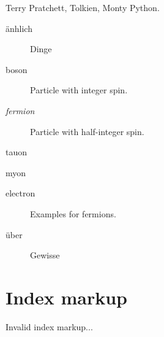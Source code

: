 \documentclass[letterpaper,10pt,english]{sphinxmanual}
\begin{document}
Terry Pratchett, Tolkien, Monty Python.

\begin{description}
\item[{änhlich}] \leavevmode{}\label{markup:term-anhlich}
Dinge

\item[{boson}] \leavevmode{}\label{markup:term-boson}
Particle with integer spin.

\item[{\emph{fermion}}] \leavevmode{}\label{markup:term-fermion}
Particle with half-integer spin.

\item[{tauon}] \leavevmode{}\label{markup:term-tauon}\item[{myon}] \leavevmode{}\label{markup:term-myon}\item[{electron}] \leavevmode{}\label{markup:term-electron}
Examples for fermions.

\item[{über}] \leavevmode{}\label{markup:term-uber}
Gewisse

\end{description}


\begin{productionlist}
\label{markup:grammar-token-try_stmt}
\label{markup:grammar-token-try1_stmt}
\label{markup:grammar-token-try2_stmt}
\end{productionlist}



\section{Index markup}
\label{markup:index-markup}
Invalid index markup...
\end{document}
